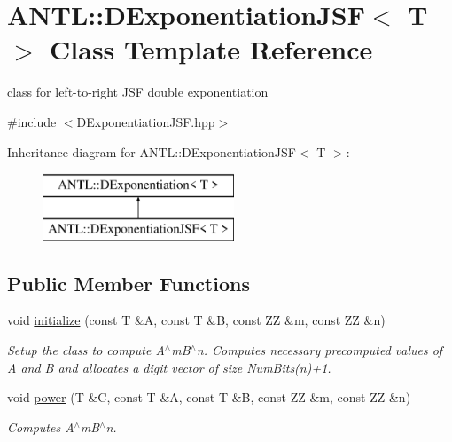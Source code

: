 \hypertarget{classANTL_1_1DExponentiationJSF}{\section{A\-N\-T\-L\-:\-:D\-Exponentiation\-J\-S\-F$<$ T $>$ Class Template Reference}
\label{classANTL_1_1DExponentiationJSF}
}


class for left-\/to-\/right J\-S\-F double exponentiation  




{\ttfamily \#include $<$D\-Exponentiation\-J\-S\-F.\-hpp$>$}

Inheritance diagram for A\-N\-T\-L\-:\-:D\-Exponentiation\-J\-S\-F$<$ T $>$\-:\begin{figure}[H]
\begin{center}
\leavevmode
\includegraphics[height=2.000000cm]{d9/d81/classANTL_1_1DExponentiationJSF}
\end{center}
\end{figure}
\subsection*{Public Member Functions}
\begin{DoxyCompactItemize}
\item 
void \hyperlink{classANTL_1_1DExponentiationJSF_a5b8470104a966d52fe263b6d250afe83}{initialize} (const T \&A, const T \&B, const Z\-Z \&m, const Z\-Z \&n)
\begin{DoxyCompactList}\small\item\em Setup the class to compute A$^\wedge$m\-B$^\wedge$n. Computes necessary precomputed values of A and B and allocates a digit vector of size Num\-Bits(n)+1. \end{DoxyCompactList}\item 
void \hyperlink{classANTL_1_1DExponentiationJSF_a6feea3283cf55fe5f8aa3b0cf1f9cebe}{power} (T \&C, const T \&A, const T \&B, const Z\-Z \&m, const Z\-Z \&n)
\begin{DoxyCompactList}\small\item\em Computes A$^\wedge$m\-B$^\wedge$n. \end{DoxyCompactList}\end{DoxyCompactItemize}
